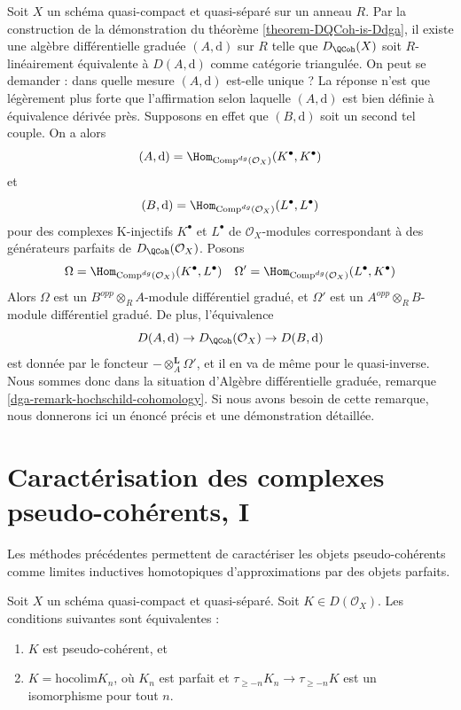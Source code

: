\begin{remark}
\label{remark-independence-choice}
Soit $X$ un schéma quasi-compact et quasi-séparé sur un anneau $R$.
Par la construction de la démonstration du
théorème \ref{theorem-DQCoh-is-Ddga},
il existe une algèbre différentielle graduée $(A, \text{d})$ sur $R$
telle que $D_\QCoh(X)$ soit $R$-linéairement équivalente à
$D(A, \text{d})$ comme catégorie triangulée.
On peut se demander : dans quelle mesure $(A, \text{d})$ est-elle unique ?
La réponse n'est que légèrement plus forte que l'affirmation selon laquelle
$(A, \text{d})$ est bien définie à équivalence dérivée près.
Supposons en effet que $(B, \text{d})$ soit un second tel couple.
On a alors
$$
(A, \text{d}) = \Hom_{\text{Comp}^{dg}(\mathcal{O}_X)}(K^\bullet, K^\bullet)
$$
et
$$
(B, \text{d}) = \Hom_{\text{Comp}^{dg}(\mathcal{O}_X)}(L^\bullet, L^\bullet)
$$
pour des complexes K-injectifs $K^\bullet$ et $L^\bullet$
de $\mathcal{O}_X$-modules correspondant à des générateurs parfaits
de $D_\QCoh(\mathcal{O}_X)$. Posons
$$
\Omega = \Hom_{\text{Comp}^{dg}(\mathcal{O}_X)}(K^\bullet, L^\bullet)
\quad
\Omega' = \Hom_{\text{Comp}^{dg}(\mathcal{O}_X)}(L^\bullet, K^\bullet)
$$
Alors $\Omega$ est un $B^{opp} \otimes_R A$-module différentiel gradué,
et $\Omega'$ est un $A^{opp} \otimes_R B$-module différentiel gradué.
De plus, l'équivalence
$$
D(A, \text{d}) \to D_\QCoh(\mathcal{O}_X) \to
D(B, \text{d})
$$
est donnée par le foncteur $- \otimes_A^\mathbf{L} \Omega'$, et il en va
de même pour le quasi-inverse. Nous sommes donc dans la situation
d'Algèbre différentielle graduée, remarque \ref{dga-remark-hochschild-cohomology}.
Si nous avons besoin de cette remarque, nous donnerons ici un énoncé précis
et une démonstration détaillée.
\end{remark}




\section{Caractérisation des complexes pseudo-cohérents, I}
\label{section-pseudo-coherent-hocolim}

\noindent
Les méthodes précédentes permettent de caractériser les objets pseudo-cohérents
comme limites inductives homotopiques d'approximations par des objets parfaits.

\begin{lemma}
\label{lemma-pseudo-coherent-hocolim}
Soit $X$ un schéma quasi-compact et quasi-séparé.
Soit $K \in D(\mathcal{O}_X)$. Les conditions suivantes sont équivalentes :
\begin{enumerate}
\item $K$ est pseudo-cohérent, et
\item $K = \text{hocolim} K_n$, où
$K_n$ est parfait et $\tau_{\geq -n}K_n \to \tau_{\geq -n}K$
est un isomorphisme pour tout $n$.
\end{enumerate}
\end{lemma}

